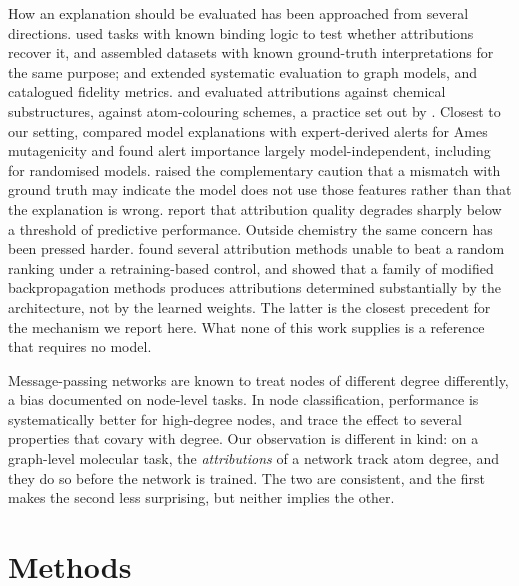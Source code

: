 \documentclass[journal=jcisd8,manuscript=article]{achemso}
\begin{document}
How an explanation should be evaluated has been approached from several directions.
\citet{mccloskey2019attribution} used tasks with known binding logic to test whether
attributions recover it, and \citet{matveieva2021} assembled datasets with known ground-truth
interpretations for the same purpose;
\citet{sanchez2020evaluating} and \citet{agarwal2023graphxai} extended systematic evaluation
to graph models, and \citet{amara2022graphframex} catalogued fidelity metrics.
\citet{rao2022quantitative} and \citet{wu2023sme} evaluated attributions against chemical
substructures, \citet{jimenezluna2021coloring} against atom-colouring schemes, a practice set out by
\citet{sheridan2019}. Closest to our
setting, \citet{walter2024} compared model explanations with expert-derived alerts for Ames
mutagenicity and \citet{hartog2024} found alert importance largely model-independent,
including for randomised models. \citet{faber2021comparing} raised the complementary caution
that a mismatch with ground truth may indicate the model does not use those features rather
than that the explanation is wrong. \citet{khasanova2026} report that attribution quality
degrades sharply below a threshold of predictive performance. Outside chemistry the same
concern has been pressed harder. \citet{hooker2019} found several attribution methods unable
to beat a random ranking under a retraining-based control, and \citet{sixt2020} showed that
a family of modified backpropagation methods produces attributions determined substantially
by the architecture, not by the learned weights. The latter is the closest precedent
for the mechanism we report here. What none of this work supplies is a reference that
requires no model.

Message-passing networks are known to treat nodes of different degree differently, a bias
documented on node-level tasks. In node classification,
performance is systematically better for high-degree
nodes,\cite{subramonian2024,ju2023} and \citet{subramonian2024} trace the effect to several
properties that covary with degree. Our observation is different in kind: on a graph-level molecular task, the
\emph{attributions} of a network track atom degree, and they do so before the network is
trained. The two are consistent, and the first makes the second less surprising, but neither
implies the other.

\section{Methods}
\end{document}
